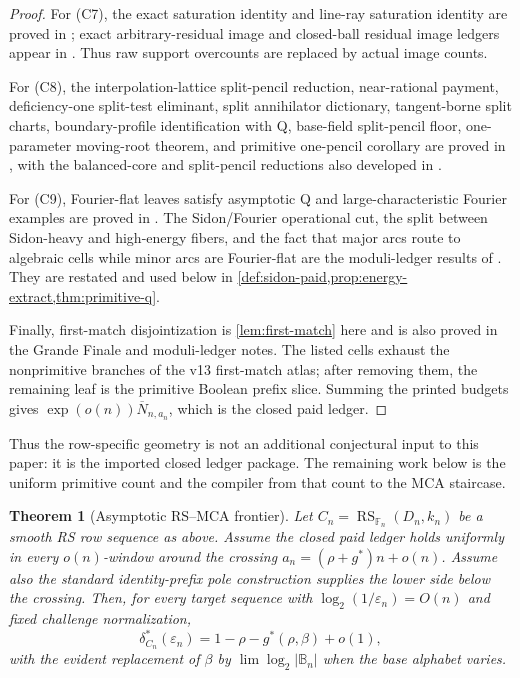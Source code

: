 \documentclass[11pt,a4paper]{amsart}
\numberwithin{equation}{section}
\newtheorem{theorem}{Theorem}[section]
\theoremstyle{remark}
\DeclareMathOperator{\RS}{RS}
\newcommand{\F}{\mathbb F}
\newcommand{\B}{\mathbb B}
\newcommand{\barN}{\overline N}
\newcommand{\eps}{\varepsilon}
\begin{document}
\begin{proof}
For \textup{(C7)}, the exact saturation identity and line-ray saturation identity are proved in \cite[saturation and line-ray saturation identities]{Cho26Grande}; exact arbitrary-residual image and closed-ball residual image ledgers appear in \cite[residual image ledgers]{Cho26CapV13}.  Thus raw support overcounts are replaced by actual image counts.

For \textup{(C8)}, the interpolation-lattice split-pencil reduction, near-rational payment, deficiency-one split-test eliminant, split annihilator dictionary, tangent-borne split charts, boundary-profile identification with Q, base-field split-pencil floor, one-parameter moving-root theorem, and primitive one-pencil corollary are proved in \cite[split-pencil and BC sections]{Cho26Grande}, with the balanced-core and split-pencil reductions also developed in \cite[rank-one and split-pencil reductions]{Cho26CapV13}.

For \textup{(C9)}, Fourier-flat leaves satisfy asymptotic Q and large-characteristic Fourier examples are proved in \cite[Fourier-flat Q section]{Cho26Grande}.  The Sidon/Fourier operational cut, the split between Sidon-heavy and high-energy fibers, and the fact that major arcs route to algebraic cells while minor arcs are Fourier-flat are the moduli-ledger results of \cite{Cho26ModuliFinal,Cho26ModuliSelf}.  They are restated and used below in \cref{def:sidon-paid,prop:energy-extract,thm:primitive-q}.

Finally, first-match disjointization is \cref{lem:first-match} here and is also proved in the Grande Finale and moduli-ledger notes.  The listed cells exhaust the nonprimitive branches of the v13 first-match atlas; after removing them, the remaining leaf is the primitive Boolean prefix slice.  Summing the printed budgets gives \(\exp(o(n))\barN_{n,a_n}\), which is the closed paid ledger.
\end{proof}

Thus the row-specific geometry is not an additional conjectural input to this paper: it is the imported closed ledger package.  The remaining work below is the uniform primitive count and the compiler from that count to the MCA staircase.

\begin{theorem}[Asymptotic RS--MCA frontier]\label{thm:frontier}
Let \(C_n=\RS_{\F_n}(D_n,k_n)\) be a smooth RS row sequence as above.  Assume the closed paid ledger holds uniformly in every \(o(n)\)-window around the crossing \(a_n=(\rho+g^*)n+o(n)\).  Assume also the standard identity-prefix pole construction supplies the lower side below the crossing.  Then, for every target sequence with \(\log_2(1/\eps_n)=O(n)\) and fixed challenge normalization,
\[
        \delta_{C_n}^*(\eps_n)
        =1-\rho-g^*(\rho,\beta)+o(1),
\]
with the evident replacement of \(\beta\) by \(\lim\log_2|\B_n|\) when the base alphabet varies.
\end{theorem}
\end{document}
